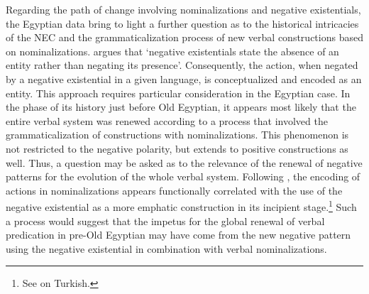 \documentclass[output=paper,draft,draftmode,colorlinks,citecolor=brown]{langscibook}
\begin{document}
Regarding the path of change involving nominalizations and negative existentials, the Egyptian data bring to light a further question as to the historical intricacies of the NEC and the grammaticalization process of new verbal constructions based on nominalizations. \citet[139]{Veselinova2013} argues that ‘negative existentials state the absence of an entity rather than negating its presence’. Consequently, the action, when negated by a negative existential in a given language, is conceptualized and encoded as an entity. This approach requires particular consideration in the Egyptian case. In the phase of its history just before Old Egyptian, it appears most likely that the entire verbal system was renewed according to a process that involved the grammaticalization of constructions with nominalizations. This phenomenon is not restricted to the negative polarity, but extends to positive constructions as well. Thus, a question may be asked as to the relevance of the renewal of negative patterns for the evolution of the whole verbal system. Following \citet{Veselinova2016}, the encoding of actions in nominalizations appears functionally correlated with the use of the negative existential as a more emphatic construction in its incipient stage.\footnote{See \citet[160]{Veselinova2016} on Turkish.}
Such a process would suggest that the impetus for the global renewal of verbal predication in pre-Old Egyptian may have come from the new negative pattern using the negative existential in combination with verbal nominalizations. 
 
\end{document}
